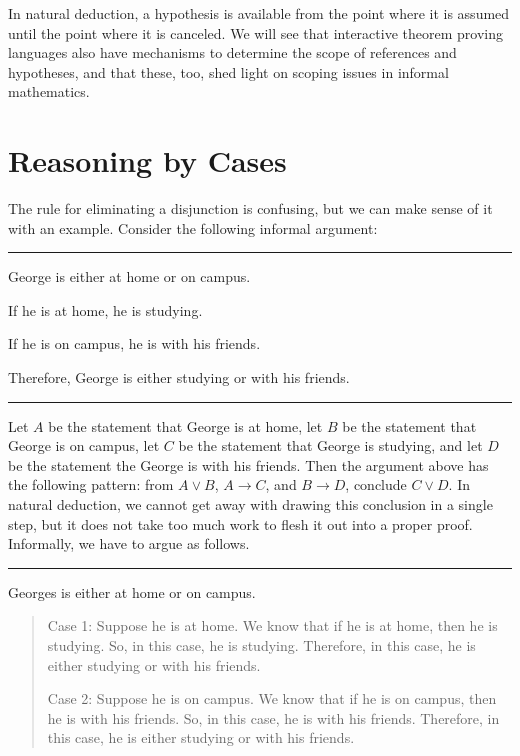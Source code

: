 \documentclass[letterpaper,10pt,english]{sphinxmanual}
\begin{document}
\sphinxAtStartPar
In natural deduction, a hypothesis is available from the point where it is assumed until the point where it is canceled. We will see that interactive theorem proving languages also have mechanisms to determine the scope of references and hypotheses, and that these, too, shed light on scoping issues in informal mathematics.


\section{Reasoning by Cases}
\label{\detokenize{natural_deduction_for_propositional_logic:reasoning-by-cases}}
\sphinxAtStartPar
The rule for eliminating a disjunction is confusing, but we can make sense of it with an example. Consider the following informal argument:


\bigskip\hrule\bigskip


\sphinxAtStartPar
George is either at home or on campus.

\sphinxAtStartPar
If he is at home, he is studying.

\sphinxAtStartPar
If he is on campus, he is with his friends.

\sphinxAtStartPar
Therefore, George is either studying or with his friends.


\bigskip\hrule\bigskip


\sphinxAtStartPar
Let \(A\) be the statement that George is at home, let \(B\) be the statement that George is on campus, let \(C\) be the statement that George is studying, and let \(D\) be the statement the George is with his friends. Then the argument above has the following pattern: from \(A \vee B\), \(A \to C\), and \(B \to D\), conclude \(C \vee D\). In natural deduction, we cannot get away with drawing this conclusion in a single step, but it does not take too much work to flesh it out into a proper proof. Informally, we have to argue as follows.


\bigskip\hrule\bigskip


\sphinxAtStartPar
Georges is either at home or on campus.
\begin{quote}

\sphinxAtStartPar
Case 1: Suppose he is at home. We know that if he is at home, then he is studying. So, in this case, he is studying. Therefore, in this case, he is either studying or with his friends.

\sphinxAtStartPar
Case 2: Suppose he is on campus. We know that if he is on campus, then he is with his friends. So, in this case, he is with his friends. Therefore, in this case, he is either studying or with his friends.
\end{quote}
\end{document}
